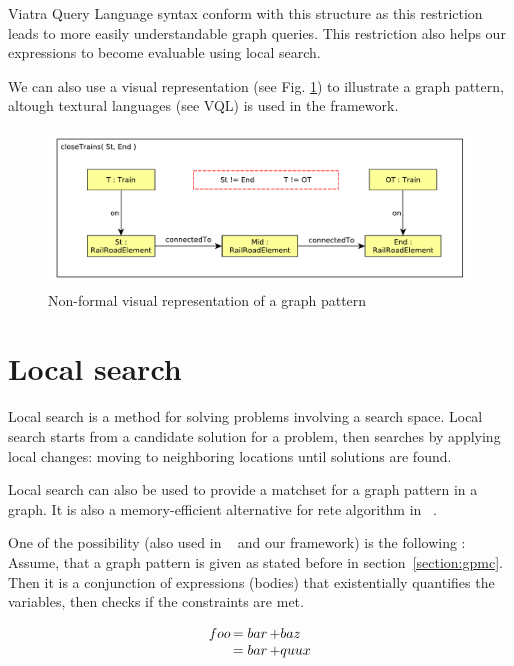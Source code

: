 Viatra Query Language syntax conform with this structure as this restriction leads to more easily understandable graph queries.
This restriction also helps our expressions to become evaluable using local search.

We can also use a visual representation (see Fig. \ref{fig:pattern-visual}) to illustrate a graph pattern, altough textural languages (see VQL) is used in the framework.

\begin{figure}[h]
	\begin{center}
		\includegraphics[width=\textwidth]{figures/closeTrains-pattern.pdf}
		\caption{Non-formal visual representation of a graph pattern}
		\label{fig:pattern-visual}
	\end{center}
\end{figure}


\section{Local search}

Local search is a method for solving problems involving a search space. 
Local search starts from a candidate solution for a problem, then searches by applying local changes: moving to neighboring locations until solutions are found.

Local search can also be used to provide a matchset for a graph pattern in a graph.
It is also a memory-efficient alternative for rete algorithm in \viatra{}~\cite{bur-marton-msc}.

One of the possibility (also used in ~\cite{bur-marton-msc} and our framework) is the following :
Assume, that a graph pattern is given as stated before in section~\ref{section:gpmc}.
Then it is a conjunction of expressions (bodies) that existentially quantifies the variables, then checks if the constraints are met.

\begin{equation}
\begin{array}{@{}r@{\,}l@{\,}l@{}}
foo &= bar &+ baz\\
&= bar &+ quux
\end{array}
\end{equation}


